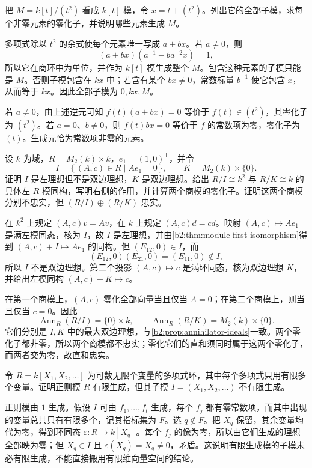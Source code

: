 \begin{exercise}\label{b2:ex:02-dual-numbers-submodules}
	把 \(M=k[t]/(t^2)\) 看成 \(k[t]\) 模，令 \(x=t+(t^2)\)。列出它的全部子模，求每个非零元素的零化子，并说明哪些元素生成 \(M\)。
\end{exercise}
\begin{solution}
	多项式除以 \(t^2\) 的余式使每个元素唯一写成 \(a+bx\)。若 \(a\ne0\)，则
	\[
		(a+bx)(a^{-1}-ba^{-2}x)=1,
	\]
	所以它在商环中为单位，并作为 \(k[t]\) 模生成整个 \(M\)。包含这种元素的子模只能是 \(M\)。否则子模包含在 \(kx\) 中；若含有某个 \(bx\ne0\)，常数标量 \(b^{-1}\) 使它包含 \(x\)，从而等于 \(kx\)。因此全部子模为 \(0,kx,M\)。

	若 \(a\ne0\)，由上述逆元可知 \(f(t)(a+bx)=0\) 等价于 \(f(t)\in(t^2)\)，其零化子为 \((t^2)\)。若 \(a=0\)、\(b\ne0\)，则 \(f(t)bx=0\) 等价于 \(f\) 的常数项为零，零化子为 \((t)\)。生成元恰为常数项非零的元素。
\end{solution}

\begin{exercise}\label{b2:ex:02-left-ideal-annihilator}
	设 \(k\) 为域，\(R=M_2(k)\times k\)，\(e_1=(1,0)^{\mathsf T}\)，并令
	\[
		I=\{\,(A,c)\in R\mid Ae_1=0\,\},\qquad K=M_2(k)\times\{0\}.
	\]
	证明 \(I\) 是左理想但不是双边理想，\(K\) 是双边理想。给出 \(R/I\cong k^2\) 与 \(R/K\cong k\) 的具体左 \(R\) 模同构，写明右侧的作用，并计算两个商模的零化子。证明这两个商模分别不忠实，但 \((R/I)\oplus(R/K)\) 忠实。
\end{exercise}
\begin{solution}
	在 \(k^2\) 上规定 \((A,c)v=Av\)，在 \(k\) 上规定 \((A,c)d=cd\)。映射 \((A,c)\mapsto Ae_1\) 是满左模同态，核为 \(I\)，故 \(I\) 是左理想，并由\cref{b2:thm:module-first-isomorphism}得到 \((A,c)+I\mapsto Ae_1\) 的同构。但 \((E_{12},0)\in I\)，而
	\[
		(E_{12},0)(E_{21},0)=(E_{11},0)\notin I,
	\]
	所以 \(I\) 不是双边理想。第二个投影 \((A,c)\mapsto c\) 是满环同态，核为双边理想 \(K\)，并给出左模同构 \((A,c)+K\mapsto c\)。

	在第一个商模上，\((A,c)\) 零化全部向量当且仅当 \(A=0\)；在第二个商模上，则当且仅当 \(c=0\)。因此
	\[
		\operatorname{Ann}_R(R/I)=\{0\}\times k,\qquad \operatorname{Ann}_R(R/K)=M_2(k)\times\{0\}.
	\]
	它们分别是 \(I,K\) 中的最大双边理想，与\cref{b2:prop:annihilator-ideals}一致。两个零化子都非零，所以两个商模都不忠实；零化它们的直和须同时属于这两个零化子，而两者交为零，故直和忠实。
\end{solution}

\begin{exercise}\label{b2:ex:02-nonfinite-submodule}
	令 \(R=k[X_1,X_2,\ldots]\) 为可数无限个变量的多项式环，其中每个多项式只用有限多个变量。证明正则模 \(R\) 有限生成，但其子模 \(I=(X_1,X_2,\ldots)\) 不有限生成。
\end{exercise}
\begin{solution}
	正则模由 \(1\) 生成。假设 \(I\) 可由 \(f_1,\ldots,f_t\) 生成，每个 \(f_j\) 都有零常数项，而其中出现的变量总共只有有限多个，记其指标集为 \(F\)。选 \(q\notin F\)。把 \(X_q\) 保留，其余变量均代为零，得到环同态 \(\varepsilon:R\to k[X_q]\)。每个 \(f_j\) 的像为零，所以由它们生成的理想全部映为零；但 \(X_q\in I\) 且 \(\varepsilon(X_q)=X_q\ne0\)，矛盾。这说明有限生成模的子模未必有限生成，不能直接搬用有限维向量空间的结论。
\end{solution}

